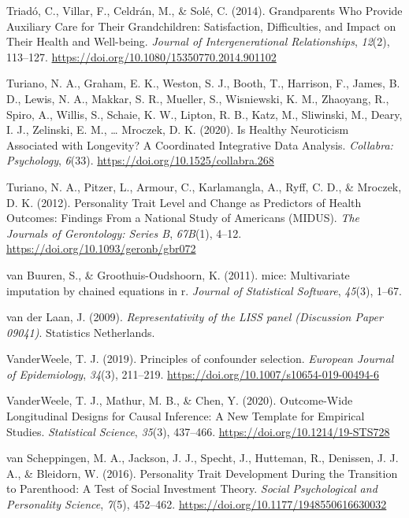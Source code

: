 \documentclass[
  english,
  man, noextraspace]{apa7}
\begin{document}
\leavevmode\hypertarget{ref-triadoGrandparentsWhoProvide2014}{}%
Triadó, C., Villar, F., Celdrán, M., \& Solé, C. (2014). Grandparents Who Provide Auxiliary Care for Their Grandchildren: Satisfaction, Difficulties, and Impact on Their Health and Well-being. \emph{Journal of Intergenerational Relationships}, \emph{12}(2), 113--127. \url{https://doi.org/10.1080/15350770.2014.901102}

\leavevmode\hypertarget{ref-turianoHealthyNeuroticismAssociated2020}{}%
Turiano, N. A., Graham, E. K., Weston, S. J., Booth, T., Harrison, F., James, B. D., Lewis, N. A., Makkar, S. R., Mueller, S., Wisniewski, K. M., Zhaoyang, R., Spiro, A., Willis, S., Schaie, K. W., Lipton, R. B., Katz, M., Sliwinski, M., Deary, I. J., Zelinski, E. M., \ldots{} Mroczek, D. K. (2020). Is Healthy Neuroticism Associated with Longevity? A Coordinated Integrative Data Analysis. \emph{Collabra: Psychology}, \emph{6}(33). \url{https://doi.org/10.1525/collabra.268}

\leavevmode\hypertarget{ref-turianoPersonalityTraitLevel2012}{}%
Turiano, N. A., Pitzer, L., Armour, C., Karlamangla, A., Ryff, C. D., \& Mroczek, D. K. (2012). Personality Trait Level and Change as Predictors of Health Outcomes: Findings From a National Study of Americans (MIDUS). \emph{The Journals of Gerontology: Series B}, \emph{67B}(1), 4--12. \url{https://doi.org/10.1093/geronb/gbr072}

\leavevmode\hypertarget{ref-mice2011}{}%
van Buuren, S., \& Groothuis-Oudshoorn, K. (2011). mice: Multivariate imputation by chained equations in r. \emph{Journal of Statistical Software}, \emph{45}(3), 1--67.

\leavevmode\hypertarget{ref-vanderlaanRepresentativityLISSPanel2009}{}%
van der Laan, J. (2009). \emph{Representativity of the LISS panel (Discussion Paper 09041)}. Statistics Netherlands.

\leavevmode\hypertarget{ref-vanderweelePrinciplesConfounderSelection2019}{}%
VanderWeele, T. J. (2019). Principles of confounder selection. \emph{European Journal of Epidemiology}, \emph{34}(3), 211--219. \url{https://doi.org/10.1007/s10654-019-00494-6}

\leavevmode\hypertarget{ref-vanderweeleOutcomeWideLongitudinalDesigns2020}{}%
VanderWeele, T. J., Mathur, M. B., \& Chen, Y. (2020). Outcome-Wide Longitudinal Designs for Causal Inference: A New Template for Empirical Studies. \emph{Statistical Science}, \emph{35}(3), 437--466. \url{https://doi.org/10.1214/19-STS728}

\leavevmode\hypertarget{ref-vanscheppingenPersonalityTraitDevelopment2016}{}%
van Scheppingen, M. A., Jackson, J. J., Specht, J., Hutteman, R., Denissen, J. J. A., \& Bleidorn, W. (2016). Personality Trait Development During the Transition to Parenthood: A Test of Social Investment Theory. \emph{Social Psychological and Personality Science}, \emph{7}(5), 452--462. \url{https://doi.org/10.1177/1948550616630032}
\end{document}
